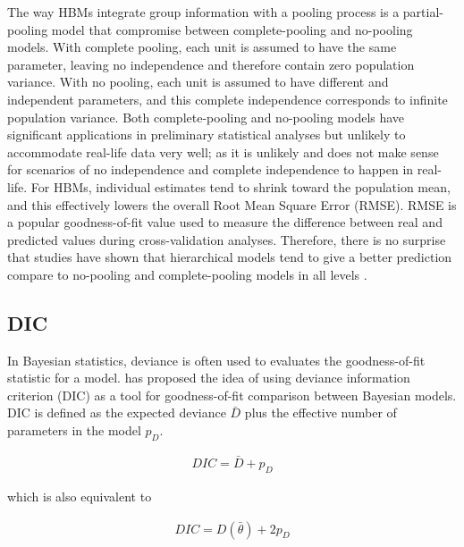 \newpara

The way HBMs integrate group information with a pooling process is a partial-pooling model that compromise between complete-pooling and no-pooling models. With complete pooling, each unit is assumed to have the same parameter, leaving no independence and therefore contain zero population variance. With no pooling, each unit is assumed to have different and independent parameters, and this complete independence corresponds to infinite population variance. Both complete-pooling and no-pooling models have significant applications in preliminary statistical analyses but unlikely to accommodate real-life data very well; as it is unlikely and does not make sense for scenarios of no independence and complete independence to happen in real-life. For HBMs, individual estimates tend to shrink toward the population mean, and this effectively lowers the overall Root Mean Square Error (RMSE). RMSE is a popular goodness-of-fit value used to measure the difference between real and predicted values during cross-validation analyses. Therefore, there is no surprise that studies have shown that hierarchical models tend to give a better prediction compare to no-pooling and complete-pooling models in all levels \citep{gelman2006multilevel, gelman2007data, park2004bayesian}. 

\subsection{DIC}

In Bayesian statistics, deviance is often used to evaluates the goodness-of-fit statistic for a model. \citet{spiegelhalter2002bayesian} has proposed the idea of using deviance information criterion (DIC) as a tool for goodness-of-fit comparison between Bayesian models. DIC is defined as the expected deviance $\bar{D}$ plus the effective number of parameters in the model $p_D$. 

\begin{equation} \label{DIC}
\begin{aligned}
DIC = \bar{D}+p_D 
\end{aligned}
\end{equation}

which is also equivalent to 

\begin{equation} \label{DIC2}
\begin{aligned}
DIC = D(\bar{\theta}) +2p_D
\end{aligned}
\end{equation}

